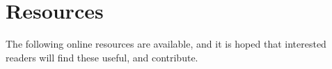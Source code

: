 \section{Resources}

The following online resources are available, and it is hoped that interested readers will find these useful, and contribute.

